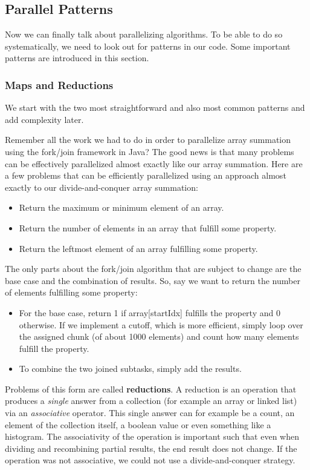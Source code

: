 \documentclass[main.tex]{subfiles}
\begin{document}
\subsection{Parallel Patterns}
Now we can finally talk about parallelizing algorithms. To be able to do so systematically, we need to look out for patterns in our code. Some important patterns are introduced in this section.

\subsubsection{Maps and Reductions}
We start with the two most straightforward and also most common patterns and add complexity later.

Remember all the work we had to do in order to parallelize array summation using the fork/join framework in Java? The good news is that many problems can be effectively parallelized almost exactly like our array summation. Here are a few problems that can be efficiently parallelized using an approach almost exactly to our divide-and-conquer array summation:

\begin{itemize}
  \item Return the maximum or minimum element of an array.
  \item Return the number of elements in an array that fulfill some property.
  \item Return the leftmost element of an array fulfilling some property.
\end{itemize}

\noindent The only parts about the fork/join algorithm that are subject to change are the base case and the combination of results. So, say we want to return the number of elements fulfilling some property:

\begin{itemize}
  \item For the base case, return 1 if array[startIdx] fulfills the property and 0 otherwise. If we implement a cutoff, which is more efficient, simply loop over the assigned chunk (of about 1000 elements) and count how many elements fulfill the property.
  \item To combine the two joined subtasks, simply add the results.
\end{itemize}

\noindent Problems of this form are called \textbf{reductions}. A reduction is an operation that produces a \textit{single} answer from a collection (for example an array or linked list) via an \textit{associative} operator. This single answer can for example be a count, an element of the collection itself, a boolean value or even something like a histogram. The associativity of the operation is important such that even when dividing and recombining partial results, the end result does not change. If the operation was not associative, we could not use a divide-and-conquer strategy.
\end{document}
